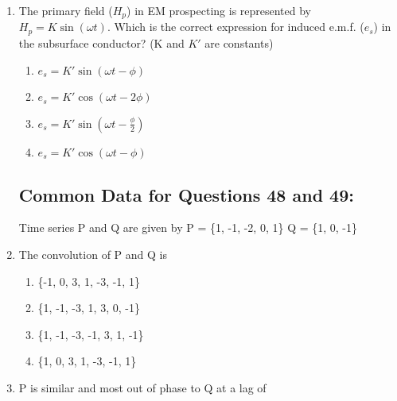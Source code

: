 \documentclass[journal,12pt,onecolumn]{IEEEtran}
\theoremstyle{remark}
\begin{document}
\begin{enumerate}[resume]

\item The primary field (\(H_p\)) in EM prospecting is represented by \(H_p = K \sin(\omega t)\). Which is the correct expression for induced e.m.f. (\(e_s\)) in the subsurface conductor? (K and \(K'\) are constants)

\begin{enumerate}
\item \(e_s = K' \sin(\omega t - \phi)\)  
\item \(e_s = K' \cos(\omega t - 2\phi)\)  
\item \(e_s = K' \sin(\omega t - \frac{\phi}{2})\)  
\item \(e_s = K' \cos(\omega t - \phi)\)  
\end{enumerate}


\subsection*{Common Data for Questions 48 and 49:}  
\vspace{0.5cm}
Time series P and Q are given by  
P = \{1, -1, -2, 0, 1\}  
Q = \{1, 0, -1\}
\vspace{0.5cm}

\item The convolution of P and Q is  
\begin{enumerate}
\item \{-1, 0, 3, 1, -3, -1, 1\}  
\item \{1, -1, -3, 1, 3, 0, -1\}  
\item \{1, -1, -3, -1, 3, 1, -1\}  
\item \{1, 0, 3, 1, -3, -1, 1\}  
\end{enumerate}


\item P is similar and most out of phase to Q at a lag of  
\begin{enumerate}
\end{enumerate}

\end{enumerate}
\end{document}
